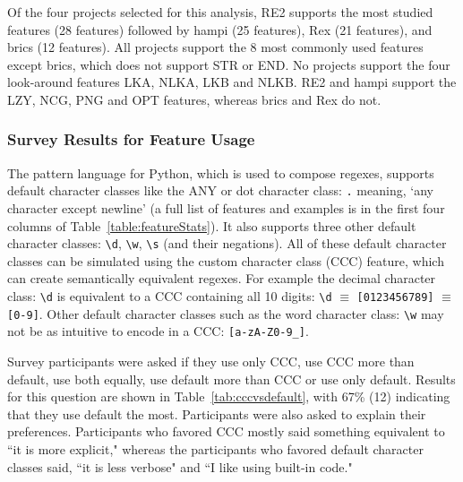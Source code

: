 Of the four projects selected for this analysis, RE2 supports the most studied features (28 features) followed by hampi (25 features),  Rex (21 features), and brics (12 features).  All projects support the 8 most commonly used features except brics, which does not support STR or END.
No projects support the four look-around features LKA, NLKA, LKB and NLKB.  RE2 and hampi support the LZY, NCG, PNG and OPT features, whereas brics and Rex do not.%


\subsubsection{Survey Results for Feature Usage}
The pattern language for Python, which is used to compose regexes, supports default character classes like the ANY or dot character class: \verb!.! meaning, `any character except newline' (a full list of features and examples is in the first four columns of Table~\ref{table:featureStats}).
It also supports three other default character classes: \verb!\d!, \verb!\w!, \verb!\s! (and their negations). All of these default character classes can be simulated using the custom character class (CCC) feature, which can create semantically equivalent regexes.
For example  the decimal character class: \verb!\d! is equivalent to a CCC containing all 10 digits:  \verb!\d! $\equiv$ \verb![0123456789]! $\equiv$ \verb![0-9]!.
Other default character classes such as the word character class: \verb!\w! may not be as intuitive to encode in a CCC: \verb![a-zA-Z0-9_]!.

Survey participants were asked if they use only CCC, use CCC more than default, use both equally, use default more than CCC or use only default.  Results for this question are shown in Table~\ref{tab:cccvsdefault}, with 67\% (12) indicating that they use default the most.
Participants were also asked to explain their preferences.  Participants who favored CCC mostly said something equivalent to ``it is more explicit," whereas the participants who favored default character classes said,  ``it is less verbose" and ``I like using built-in code."

